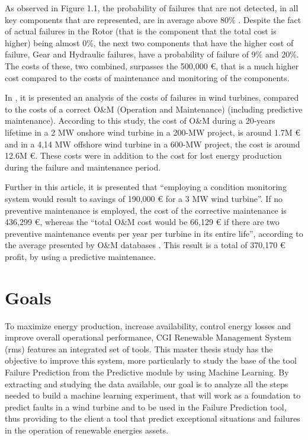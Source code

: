 As observed in Figure 1.1, the probability of failures that are not detected, in all key components that are represented, are in average above 80\% . Despite the fact of actual failures in the Rotor (that is the component that the total cost is higher) being almost 0\%, the next two components that have the higher cost of failure, Gear and Hydraulic failures, have a probability of failure of 9\%  and 20\%. The costs of these, two combined, surpasses the 500,000 €, that is a much higher cost compared to the costs of maintenance and monitoring of the components.


In \cite{OLD_53_WIND}, it is presented an analysis of the costs of failures in wind turbines, compared to the costs of a correct O&M (Operation and Maintenance) (including predictive maintenance). According to this study, the cost of O\&M during a 20-years lifetime in a 2 MW onshore wind turbine in a 200-MW project, is around 1.7M € and in a 4,14 MW offshore wind turbine in a 600-MW project, the cost is around 12.6M €. These costs were in addition to the cost for lost energy production during the failure and maintenance period.

Further in this article, it is presented that “employing a condition monitoring system would result to savings of 190,000 € for a 3 MW wind turbine”. If no preventive maintenance is employed, the cost of the corrective maintenance is 436,299 €, whereas the “total O\&M cost would be 66,129 € if there are two preventive maintenance events per year per turbine in its entire life”, according to the average presented by O&M databases \cite{OLD_53_WIND}. This result is a total of 370,170 € profit, by using a predictive maintenance.

\section{Goals} 
\label{sub:if_you_use_this_template} 

To maximize energy production, increase availability, control energy losses and improve overall operational performance, CGI Renewable Management System (\acrshort{rms}) \cite{OLD_8} features an integrated set of tools. This master thesis study has the objective to improve this system, more particularly to study the base of the tool Failure Prediction from the Predictive module by using Machine Learning. By extracting and studying the data available, our goal is to analyze all the steps needed to build a machine learning experiment, that will work as a foundation to predict faults in a wind turbine and to be used in the Failure Prediction tool, thus providing to the client a tool that predict exceptional situations and failures in the operation of renewable energies assets.

